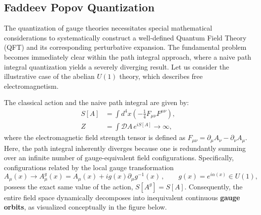 \subsection{Faddeev Popov Quantization}

The quantization of gauge theories necessitates special mathematical considerations to systematically construct a well-defined Quantum Field Theory (QFT) and its corresponding perturbative expansion. The fundamental problem becomes immediately clear within the path integral approach, where a naive path integral quantization yields a severely diverging result. Let us consider the illustrative case of the abelian \(U(1)\) theory, which describes free electromagnetism.

The classical action and the naive path integral are given by:
\begin{equation} \label{eq:naive_action_Z}
    \begin{aligned}
        S[A] & = \int d^4x \left( -\frac{1}{4}F_{\mu\nu}F^{\mu\nu} \right), \\
        Z    & = \int \mathcal{D}A \, e^{iS[A]} \to \infty,
    \end{aligned}
\end{equation}
where the electromagnetic field strength tensor is defined as \(F_{\mu\nu} = \partial_\mu A_\nu - \partial_\nu A_\mu\). Here, the path integral inherently diverges because one is redundantly summing over an infinite number of gauge-equivalent field configurations. Specifically, configurations related by the local gauge transformation
\begin{equation} \label{eq:gauge_transformation}
    A_\mu(x) \rightarrow A_\mu^g(x) = A_\mu(x) + i g(x)\partial_\mu g^{-1}(x) \, , \qquad g(x) = e^{i\alpha(x)} \in U(1),
\end{equation}
possess the exact same value of the action, \(S[A^g] = S[A]\). Consequently, the entire field space dynamically decomposes into inequivalent continuous \textbf{gauge orbits}, as visualized conceptually in the figure below.


